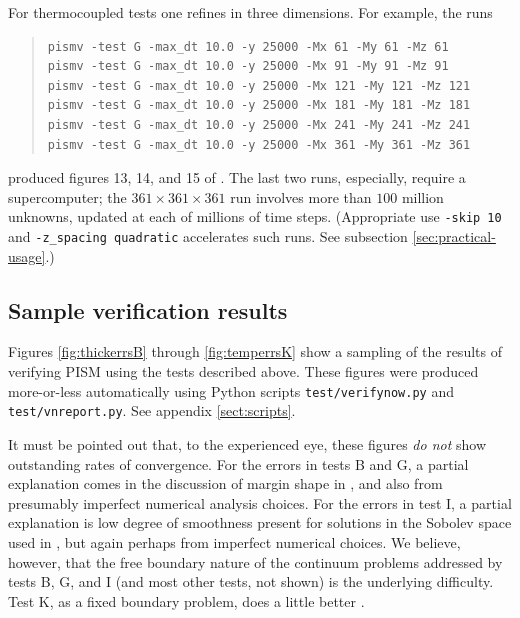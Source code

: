 \documentclass[11pt,final]{amsart}
\begin{document}
For thermocoupled tests one refines in three dimensions.  For example, the runs
\begin{quote}\small
\begin{verbatim}
pismv -test G -max_dt 10.0 -y 25000 -Mx 61 -My 61 -Mz 61
pismv -test G -max_dt 10.0 -y 25000 -Mx 91 -My 91 -Mz 91
pismv -test G -max_dt 10.0 -y 25000 -Mx 121 -My 121 -Mz 121
pismv -test G -max_dt 10.0 -y 25000 -Mx 181 -My 181 -Mz 181
pismv -test G -max_dt 10.0 -y 25000 -Mx 241 -My 241 -Mz 241
pismv -test G -max_dt 10.0 -y 25000 -Mx 361 -My 361 -Mz 361
\end{verbatim}
\normalsize\end{quote}
produced figures 13, 14, and 15 of \cite{BBL}.  The last two runs, especially, require a supercomputer; the $361\times 361\times 361$ run involves more than $100$ million unknowns, updated at each of millions of time steps.  (Appropriate use \verb|-skip 10| and \verb|-z_spacing quadratic| accelerates such runs.  See subsection \ref{sec:practical-usage}.)

\subsection{Sample verification results}  Figures \ref{fig:thickerrsB} through \ref{fig:temperrsK} show a sampling of the results of verifying PISM using the tests described above.  These figures were produced more-or-less automatically using Python scripts \verb|test/verifynow.py| and \verb|test/vnreport.py|.  See appendix \ref{sect:scripts}.

It must be pointed out that, to the experienced eye, these figures \emph{do not} show outstanding rates of convergence.  For the errors in tests B and G, a partial explanation comes in the discussion of margin shape in \cite{BLKCB}, and also from presumably imperfect numerical analysis choices.  For the errors in test I, a partial explanation is low degree of smoothness present for solutions in the Sobolev space used in \cite{SchoofStream}, but again perhaps from imperfect numerical choices.  We believe, however, that the free boundary nature of the continuum problems addressed by tests B, G, and I (and most other tests, not shown) is the underlying difficulty.  Test K, as a fixed boundary problem, does a little better \cite{BuelerTestK}.
\end{document}
